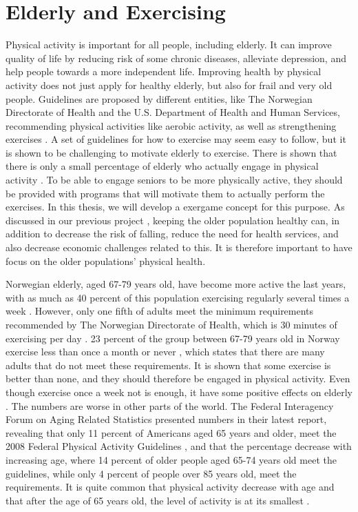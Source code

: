 \section{Elderly and Exercising}
\label{sec:exercisebehaviour}
Physical activity is important for all people, including elderly. It can improve quality of life by reducing risk of some chronic diseases, alleviate depression, and help people towards a more independent life. Improving health by physical activity does not just apply for healthy elderly, but also for frail and very old people. Guidelines are proposed by different entities, like The Norwegian Directorate of Health and the U.S. Department of Health and Human Services, recommending physical activities like aerobic activity, as well as strengthening exercises \cite{aktivitetsbok} \cite{guidelines}. A set of guidelines for how to exercise may seem easy to follow, but it is shown to be challenging to motivate elderly to exercise. There is shown that there is only a small percentage of elderly who actually engage in physical activity \cite{olderamericans}. To be able to engage seniors to be more physically active, they should be provided with programs that will motivate them to actually perform the exercises. In this thesis, we will develop a exergame concept for this purpose. As discussed in our previous project \cite{project}, keeping the older population healthy can, in addition to decrease the risk of falling, reduce the need for health services, and also decrease economic challenges related to this. It is therefore important to have focus on the older populations' physical health. 

Norwegian elderly, aged  67-79 years old, have become more active the last years, with as much as 40 percent of this population exercising regularly several times a week \cite{statisticsnorway}. However, only one fifth of adults meet the minimum requirements recommended by The Norwegian Directorate of Health, which is 30 minutes of exercising per day \cite{statistikknorge12}. 23 percent of the group between 67-79 years old in Norway exercise less than once a month or never \cite{statisticsnorway}, which states that there are many adults that do not meet these requirements. It is shown that some exercise is better than none, and they should therefore be engaged in physical activity. Even though exercise once a week not is enough, it have some positive effects on elderly \cite{gruppetrening-trheim}. The numbers are worse in other parts of the world.  The Federal Interagency Forum on Aging Related Statistics \cite{olderamericans} presented numbers in their latest report, revealing that only 11 percent of Americans aged 65 years and older, meet the 2008 Federal Physical Activity Guidelines \cite{guidelines}, and that the percentage decrease with increasing age, where 14 percent of older people aged 65-74 years old meet the guidelines, while only 4 percent of people over 85 years old, meet the requirements.  It is quite common that physical activity decrease with age and that after the age of 65 years old, the level of activity is at its smallest \cite{schutzer}. 
 
